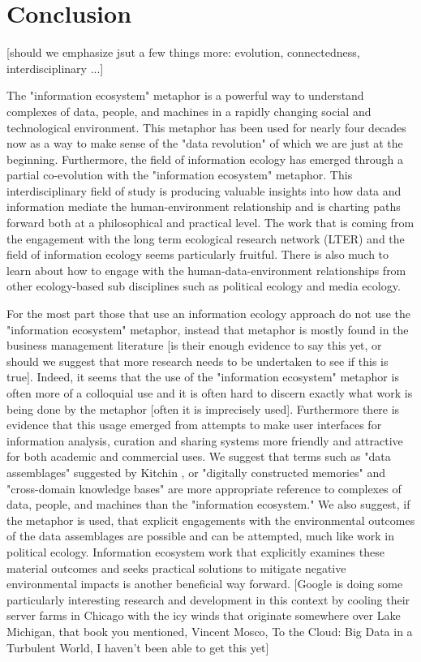\section{Conclusion}

[should we emphasize jsut a few things more: evolution, connectedness, interdisciplinary ...]

The "information ecosystem" metaphor is a powerful way to understand complexes of data, people, and machines in a rapidly changing social and technological environment. This metaphor has been used for nearly four decades now as a way to make sense of the "data revolution" of which we are just at the beginning. Furthermore, the field of information ecology has emerged through a partial co-evolution with the "information ecosystem" metaphor. This interdisciplinary field of study is producing valuable insights into how data and information mediate the human-environment relationship and is charting paths forward both at a philosophical and practical level. The work that is coming from the engagement with the long term ecological research network (LTER) and the field of information ecology seems particularly fruitful. There is also much to learn about how to engage with the human-data-environment relationships from other ecology-based sub disciplines such as political ecology and media ecology. 

For the most part those that use an information ecology approach do not use the "information ecosystem" metaphor, instead that metaphor is mostly found in the business management literature [is their enough evidence to say this yet, or should we suggest that more research needs to be undertaken to see if this is true]. Indeed, it seems that the use of the "information ecosystem" metaphor is often more of a colloquial use and it is often hard to discern exactly what work is being done by the metaphor [often it is imprecisely used]. Furthermore there is evidence that this usage emerged from attempts to make user interfaces for information analysis, curation and sharing systems more friendly and attractive for both academic and commercial uses. We suggest that terms such as "data assemblages" suggested by Kitchin \citep{kitchin_2014}, or "digitally constructed memories" and "cross-domain knowledge bases" \citep{baker_2007} are more appropriate reference to complexes of data, people, and machines than the "information ecosystem." We also suggest, if the metaphor is used, that explicit engagements with the environmental outcomes of the data assemblages are possible and can be attempted, much like work in political ecology. Information ecosystem work that explicitly examines these material outcomes and seeks practical solutions to mitigate negative environmental impacts is another beneficial way forward. [Google is doing some particularly interesting research and development in this context by cooling their server farms in Chicago with the icy winds that originate somewhere over Lake Michigan, that book you mentioned, Vincent Mosco, To the Cloud: Big Data in a Turbulent World, I haven't been able to get this yet]

